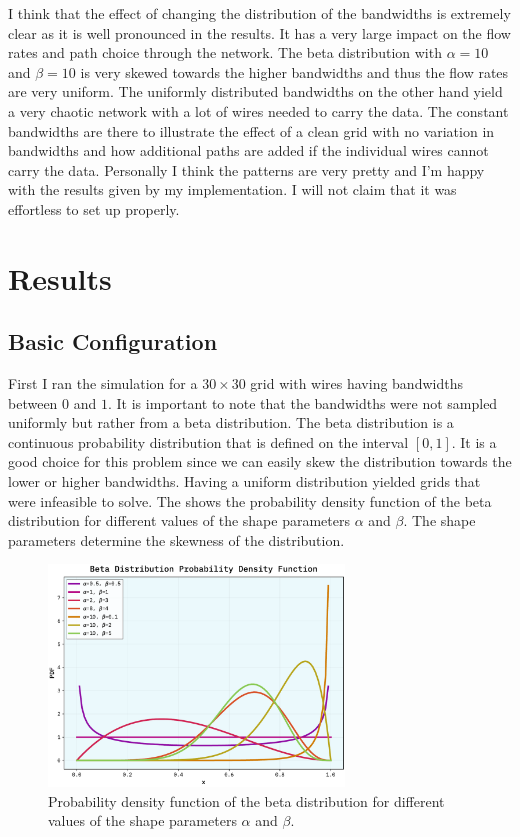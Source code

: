\documentclass[10pt, titlepage, a4paper]{article}
\begin{document}
I think that the effect of changing the distribution of the bandwidths is extremely clear as it is well pronounced in the
results. It has a very large impact on the flow rates and path choice through the network. The beta distribution with
$\alpha = 10$ and $\beta = 10$ is very skewed towards the higher bandwidths and thus the flow rates are very uniform. The uniformly 
distributed bandwidths on the other hand yield a very chaotic network with a lot of wires needed to carry the data. The constant
bandwidths are there to illustrate the effect of a clean grid with no variation in bandwidths and how additional paths are added if the 
individual wires cannot carry the data. Personally I think the patterns are very pretty and I'm happy with the results given by my implementation.
I will not claim that it was effortless to set up properly. \\


\section{Results}
\subsection{Basic Configuration}
First I ran the simulation for a $30\times 30$ grid with wires having bandwidths between $0$ and $1$. It is important to note 
that the bandwidths were not sampled uniformly but rather from a beta distribution. The beta distribution is a 
continuous probability distribution that is defined on the interval $[0, 1]$. It is a good choice for this problem
since we can easily skew the distribution towards the lower or higher bandwidths. Having a uniform distribution yielded 
grids that were infeasible to solve. The \textcolor{red}{} shows the probability density function
of the beta distribution for different values of the shape parameters $\alpha$ and $\beta$. The shape parameters determine
the skewness of the distribution. 

\begin{figure}[H]
    \centering
    \includegraphics[width=0.7\textwidth]{../Images/beta_dist.pdf}
    \caption{Probability density function of the beta distribution for different values of the shape parameters $\alpha$ and $\beta$.}
    \label{fig:beta_dist}
\end{figure}
\end{document}
